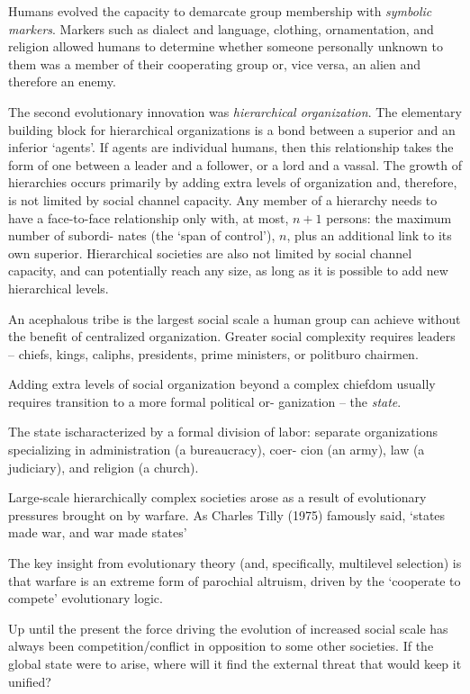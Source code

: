 \documentclass[
]{book}
\begin{document}
Humans evolved the capacity to demarcate
group membership with \emph{symbolic markers}.
Markers such as dialect and language, clothing, ornamentation, and religion allowed
humans to determine whether someone personally unknown to
them was a member of their cooperating group or, vice versa,
an alien and therefore an enemy.

The second evolutionary innovation was \emph{hierarchical organization}.
The elementary building block for hierarchical organizations
is a bond between a superior and an inferior `agents'. If agents are
individual humans, then this relationship takes the form of one
between a leader and a follower, or a lord and a vassal. The growth of
hierarchies occurs primarily by adding extra levels of organization
and, therefore, is not limited by social channel capacity. Any
member of a hierarchy needs to have a face-to-face relationship
only with, at most, \(n + 1\) persons: the maximum number of subordi-
nates (the `span of control'), \(n\), plus an additional link to its own
superior.
Hierarchical societies are also
not limited by social channel capacity, and can potentially reach any
size, as long as it is possible to add new hierarchical levels.

An acephalous tribe is the largest social scale a human
group can achieve without the benefit of centralized organization.
Greater social complexity requires leaders -- chiefs, kings, caliphs,
presidents, prime ministers, or politburo chairmen.

Adding extra levels of social organization beyond a complex
chiefdom usually requires transition to a more formal political or-
ganization -- the \emph{state}.

The state ischaracterized by a formal division of labor:
separate organizations specializing in administration (a bureaucracy), coer-
cion (an army), law (a judiciary), and religion (a church).

Large-scale hierarchically
complex societies arose as a result of evolutionary pressures
brought on by warfare. As Charles Tilly (1975) famously said,
`states made war, and war made states'

The key insight from evolutionary theory
(and, specifically, multilevel selection) is that warfare is
an extreme form of parochial altruism, driven by the `cooperate to
compete' evolutionary logic.

Up until the present the force
driving the evolution of increased social scale has always been
competition/conflict in opposition to some other societies. If the
global state were to arise, where will it find the external threat that
would keep it unified?
\end{document}
